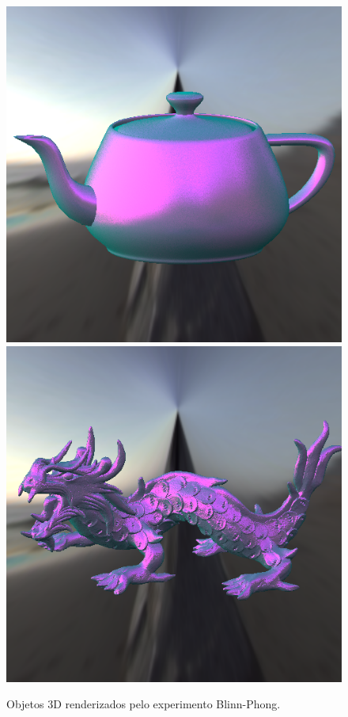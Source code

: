 \begin{figure}[H]
    \caption{\small{Objetos 3D renderizados pelo experimento Blinn-Phong.}}
    \label{fig-blinn-phong-eqlang}
  \includegraphics[width=\linewidth]{./Imagens/brdfs/blinn-phong-teapot.png}
\endminipage\hfill
{}
  \includegraphics[width=\linewidth]{./Imagens/brdfs/blinn-phong-dragon.png}

\end{figure}
